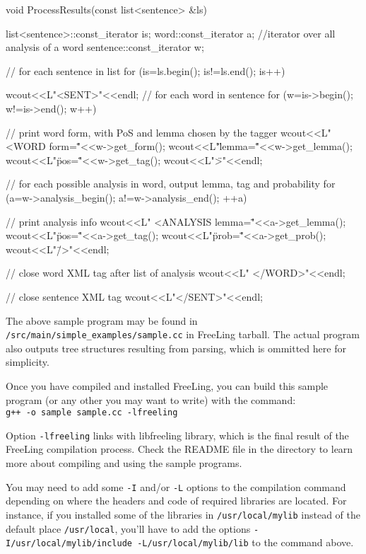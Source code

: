 \documentclass[a4paper]{book}
\begin{document}
{\footnotesize
\begin{LSTverbatim}

void ProcessResults(const list<sentence> &ls) {
  
  list<sentence>::const_iterator is;
  word::const_iterator a;   //iterator over all analysis of a word
  sentence::const_iterator w;
  
  // for each sentence in list
  for (is=ls.begin(); is!=ls.end(); is++) {

    wcout<<L"<SENT>"<<endl;
    // for each word in sentence
    for (w=is->begin(); w!=is->end(); w++) {
      
      // print word form, with PoS and lemma chosen by the tagger
      wcout<<L"  <WORD form=\""<<w->get_form();
      wcout<<L"\" lemma=\""<<w->get_lemma();
      wcout<<L"\" pos=\""<<w->get_tag();
      wcout<<L"\">"<<endl;
      
      // for each possible analysis in word, output lemma, tag and probability
      for (a=w->analysis_begin(); a!=w->analysis_end(); ++a) {
	
	// print analysis info
	wcout<<L"    <ANALYSIS lemma=\""<<a->get_lemma();
	wcout<<L"\" pos=\""<<a->get_tag();
	wcout<<L"\" prob=\""<<a->get_prob();
	wcout<<L"\"/>"<<endl;
      }
      
      // close word XML tag after list of analysis
      wcout<<L"  </WORD>"<<endl;
    }
    
    // close sentence XML tag
    wcout<<L"</SENT>"<<endl;
  }
}  
\end{LSTverbatim}
}

 The above sample program may be found in {\tt /src/main/simple\_examples/sample.cc}
 in FreeLing tarball. The actual program also outputs tree structures resulting from 
 parsing, which is ommitted here for simplicity.

 Once you have compiled and installed FreeLing, you can build this
 sample program (or any other you may want to write) with the command:\\
 {\tt g++ -o sample sample.cc -lfreeling}

 Option {\tt -lfreeling} links with libfreeling library, which is the final result of the
 FreeLing compilation process. 
 Check the README file in the directory to learn more about compiling and using
 the sample programs.

   You may need to add some  {\tt -I} and/or  {\tt -L} options to the
 compilation command depending on where the headers and code of
 required libraries are located. For instance, if you installed some
 of the libraries in {\tt /usr/local/mylib} instead of the default 
place {\tt /usr/local}, you'll have to add the options 
 {\tt -I/usr/local/mylib/include -L/usr/local/mylib/lib} 
to the command above.
\end{document}
